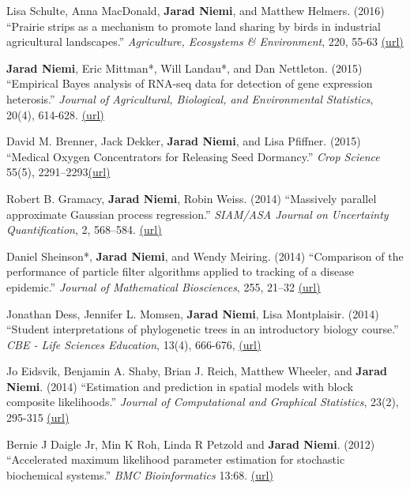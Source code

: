 \documentclass[overlapped,line]{res}
\begin{document}
\begin{resume}
Lisa Schulte, Anna MacDonald, {\bf Jarad Niemi}, and Matthew Helmers. (2016) ``Prairie strips as a mechanism to promote land sharing by birds in industrial agricultural landscapes.'' \emph{Agriculture, Ecosystems \& Environment}, 220, 55-63 \href{http://www.sciencedirect.com/science/article/pii/S016788091630007X}{(url)}

{\bf Jarad Niemi}, Eric Mittman*, Will Landau*, and Dan Nettleton. (2015) ``Empirical Bayes analysis of RNA-seq data for detection of gene expression heterosis.'' \emph{Journal of Agricultural, Biological, and Environmental Statistics}, 20(4), 614-628. \href{http://link.springer.com/article/10.1007%2Fs13253-015-0230-5}{(url)}






David M. Brenner, Jack Dekker, {\bf Jarad Niemi}, and Lisa Pfiffner. (2015) ``Medical Oxygen Concentrators for Releasing Seed Dormancy.'' \emph{Crop Science} 55(5), 2291--2293\href{https://dl.sciencesocieties.org/publications/cs/pdfs/0/0/cropsci2014.11.0783}{(url)}

Robert B. Gramacy, {\bf Jarad Niemi}, Robin Weiss. (2014) ``Massively parallel approximate Gaussian process regression.'' \emph{SIAM/ASA Journal on Uncertainty Quantification}, 2, 568--584. \href{http://epubs.siam.org/doi/abs/10.1137/130941912}{(url)}

Daniel Sheinson*, {\bf Jarad Niemi}, and Wendy Meiring. (2014) ``Comparison of the performance of particle filter algorithms applied to tracking of a disease epidemic.'' \emph{Journal of Mathematical Biosciences}, 255, 21--32 \href{http://www.sciencedirect.com/science/article/pii/S0025556414001242}{(url)}

Jonathan Dess, Jennifer L. Momsen, {\bf Jarad Niemi}, Lisa Montplaisir. (2014) ``Student interpretations of phylogenetic trees in an introductory biology course.'' \emph{CBE - Life Sciences Education}, 13(4), 666-676, \href{http://www.lifescied.org/content/13/4/666.full?sid=7d54efe2-73cc-4823-b359-0ec4066c4e5b}{(url)}

Jo Eidsvik, Benjamin A. Shaby, Brian J. Reich, Matthew Wheeler, and {\bf Jarad Niemi}. (2014) ``Estimation and prediction in spatial models with block composite likelihoods.'' \emph{Journal of Computational and Graphical Statistics}, 23(2), 295-315 \href{http://amstat.tandfonline.com/doi/abs/10.1080/10618600.2012.760460}{(url)}


Bernie J Daigle Jr, Min K Roh, Linda R Petzold and {\bf Jarad Niemi}. (2012) ``Accelerated maximum likelihood parameter estimation for stochastic biochemical systems.'' \emph{BMC Bioinformatics} 13:68. \href{http://www.biomedcentral.com/1471-2105/13/68}{(url)}


\end{resume}
\end{document}
